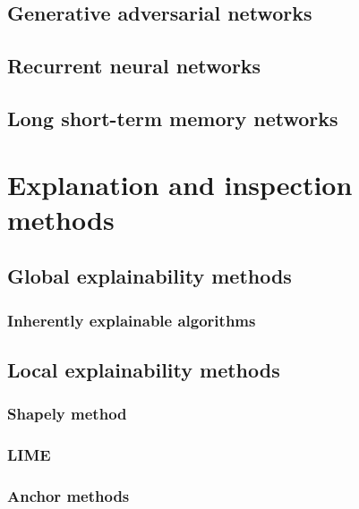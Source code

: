 \documentclass[
]{book}
\begin{document}
\hypertarget{generative-adversarial-networks}{%
\section{Generative adversarial networks}\label{generative-adversarial-networks}}

\hypertarget{recurrent-neural-networks}{%
\section{Recurrent neural networks}\label{recurrent-neural-networks}}

\hypertarget{long-short-term-memory-networks}{%
\section{Long short-term memory networks}\label{long-short-term-memory-networks}}

\hypertarget{explanation-and-inspection-methods}{%
\chapter{Explanation and inspection methods}\label{explanation-and-inspection-methods}}

\hypertarget{global-explainability-methods}{%
\section{Global explainability methods}\label{global-explainability-methods}}

\hypertarget{inherently-explainable-algorithms}{%
\subsection{Inherently explainable algorithms}\label{inherently-explainable-algorithms}}

\hypertarget{local-explainability-methods}{%
\section{Local explainability methods}\label{local-explainability-methods}}

\hypertarget{shapely-method}{%
\subsection{Shapely method}\label{shapely-method}}

\hypertarget{lime}{%
\subsection{LIME}\label{lime}}

\hypertarget{anchor-methods}{%
\subsection{Anchor methods}\label{anchor-methods}}

  
\end{document}
